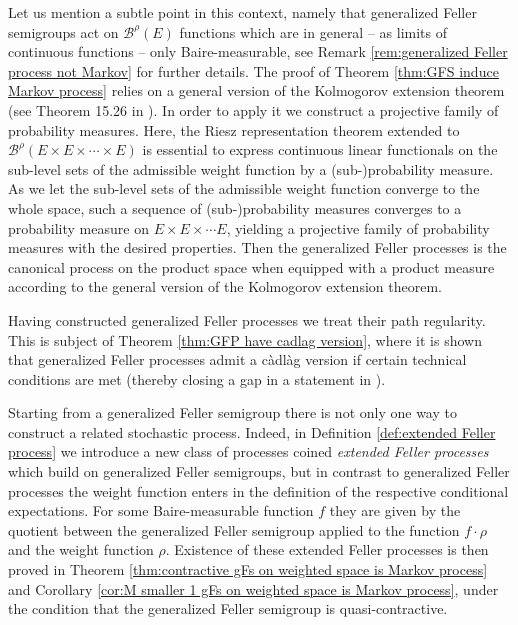 \documentclass[a4paper,12pt]{article}
\theoremstyle{definition}
\theoremstyle{remark}
\numberwithin{equation}{section}
\numberwithin{theorem}{section}
\begin{document}
Let us mention a subtle point in this context, namely that  generalized Feller semigroups act on $\mathscr{B}^{\rho}(E)$ functions which are in general -- as limits of continuous functions -- only Baire-measurable, see Remark \ref{rem:generalized Feller process not Markov} for further details. The proof of Theorem \ref{thm:GFS induce Markov process} relies on a general version of the Kolmogorov extension theorem (see Theorem 15.26 in \cite{AlB}). In order to apply it we construct a projective family of probability measures. Here, the Riesz  representation theorem extended to $\mathcal{B}^{\rho}(E\times E \times \cdots \times E)$ is essential to express continuous linear functionals  on the sub-level sets of the admissible weight function by a (sub-)probability measure. As we let the sub-level sets of the admissible weight function converge to the whole space, such a sequence of (sub-)probability measures converges to a probability measure on  $E\times E \times \cdots E$, yielding a projective family of probability measures with the desired properties. Then the generalized Feller processes is the canonical process on the product space when equipped with a product measure according to the general version of the Kolmogorov extension theorem.

Having constructed generalized Feller processes we treat their path regularity. This is subject of Theorem \ref{thm:GFP have cadlag version}, where it is shown that generalized Feller processes admit a càdlàg version if certain technical conditions are met (thereby closing a gap in a statement in \cite{CuT}).

Starting from a generalized Feller semigroup there is not only one way to construct a related stochastic process. Indeed, in Definition \ref{def:extended Feller process} we  introduce a new class of processes coined \emph{extended Feller processes} which build on generalized Feller semigroups, but in contrast to generalized Feller processes the weight function enters in the definition of the respective conditional expectations. For some Baire-measurable function $f$ they are given by the quotient between the generalized Feller semigroup applied to the function $f \cdot \rho$ and the weight function $\rho$. Existence of these extended Feller processes is then proved in Theorem \ref{thm:contractive gFs on weighted space is Markov process} and Corollary \ref{cor:M smaller 1 gFs on weighted space is Markov process}, under the  condition that the generalized Feller semigroup is quasi-contractive.
\end{document}
